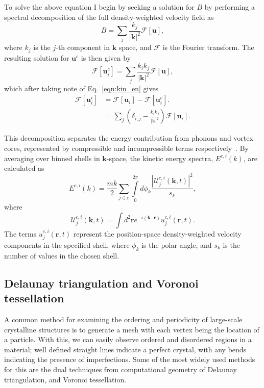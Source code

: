 {To solve the above equation I begin by seeking a solution for $B$ by performing a spectral decomposition of the full density-weighted velocity field as
\begin{equation}
    B = \displaystyle\sum\limits_{j} \frac{k_j}{|\mathbf{k}|^2}\mathscr{F}[\mathbf{u}],
\end{equation}
where $k_j$ is the $j$-th component in $\mathbf{k}$ space, and $\mathscr{F}$ is the Fourier transform. The resulting solution for $\mathbf{u}^c$ is then given by
\begin{equation}
    \mathscr{F}[\mathbf{u}_i^c] = \displaystyle\sum\limits_{j} \frac{k_i k_j}{|\mathbf{k}|^2} \mathscr{F}[\mathbf{u}],
\end{equation}
which after taking note of Eq.~\eqref{eqn:kin_en} gives
\begin{align}
    \mathscr{F}[\mathbf{u}_i^i] &= \mathscr{F}[\mathbf{u}_i] - \mathscr{F}[\mathbf{u}_i^c]. \\
    &= \displaystyle\sum\limits_{j}\left(\delta_{i,j} - \frac{k_ik_j}{|\mathbf{k}|^2}\right)\mathscr{F}[\mathbf{u}_i]. \nonumber
\end{align}

This decomposition separates the energy contribution from phonons and vortex cores, represented by compressible and incompressible terms respectively~\cite{CT:Horng_pra_2009}. By averaging over binned shells in $\mathbf{k}$-space, the kinetic energy spectra, $E^{c,i}(k)$, are calculated as~\cite{CT:Bradley_prx_2012}
\begin{equation}
	E^{c,i}(k) = \frac{mk}{2}\sum\limits_{j\in\mathbf{r}} \int\limits_{0}^{2\pi}d\phi_k \frac{ |\mathcal{U}_j^{c,i}(\mathbf{k},t) |^2}{s_k},
\end{equation}
where
\begin{equation}
	\mathcal{U}_j^{c,i}(\mathbf{k},t) = \int d^2 \mathbf{r} e^{-i(\mathbf{k}\cdot\mathbf{r})} u_j^{c,i}(\mathbf{r},t).
\end{equation}
The terms $u_j^{c,i}(\mathbf{r},t)$ represent the position-space density-weighted velocity components in the specified shell, where $\phi_k$ is the polar angle, and $s_k$ is the number of values in the chosen shell.

\subsection{Delaunay triangulation and Voronoi tessellation}\label{sec:delaunay}
A common method for examining the ordering and periodicity of large-scale crystalline structures is to generate a mesh with each vertex being the location of a particle. With this, we can easily observe ordered and disordered regions in a material; well defined straight lines indicate a perfect crystal, with any bends indicating the presence of imperfections. Some of the most widely used methods for this are the dual techniques from computational geometry of Delaunay triangulation, and Voronoi tessellation.

}
